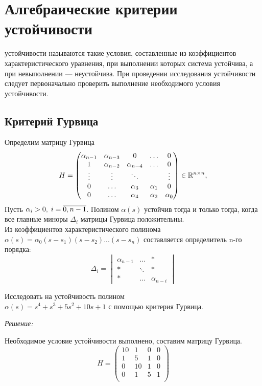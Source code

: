 \documentclass[../../TAU.tex]{subfiles}
\begin{document}
\section{Алгебраические критерии устойчивости}

     устойчивости называются такие  условия, составленные из коэффициентов характеристического уравнения, при выполнении которых система устойчива, а при невыполнении --- неустойчива. При проведении исследования устойчивости следует первоначально проверить выполнение необходимого условия устойчивости.

\subsection{Критерий Гурвица}

    Определим матрицу Гурвица
    $$
        H =\begin{pmatrix}
            \alpha_{n-1} & \alpha_{n-3} & 0 & \ldots & 0 \\
            1 & \alpha_{n-2} & \alpha_{n-4} & \ldots & 0 \\
            \vdots & \vdots & \ddots && \vdots \\
            0 & \ldots & \alpha_{3} & \alpha_1 & 0 \\
            0 & \ldots & \alpha_4 & \alpha_2 & \alpha_0
        \end{pmatrix}\in\mathbb{R}^{n\times n},
    $$
    \theor[Гурвица] Пусть 
    $\alpha_i>0,\; i=\overline{0,n-1}$.
    Полином $\alpha(s)$ устойчив тогда и только тогда, когда все главные миноры $\Delta_i$ матрицы Гурвица положительны. \\
    Из коэффициентов характеристического полинома 
    $\alpha(s)=\alpha_0(s-s_1) (s-s_2) ... (s-s_n)$
    составляется определитель n-го порядка:
    $$
        \Delta_i =
        \begin{vmatrix}
            \alpha_{n-1}& \ldots& *\\
            *& \ddots & *\\
            *& \ldots & \alpha_{n-i}
        \end{vmatrix}
    $$

    \examp Исследовать на устойчивость полином\\
    $\alpha(s) = s^4+s^3+5s^2+10s+1$ 
    с помощью критерия Гурвица.

    {\it Решение:}\par
    Необходимое условие устойчивости выполнено, составим матрицу Гурвица.
    $$
        H = 
        \begin{pmatrix}
            10 & 1 & 0 & 0\\
            1 & 5 & 1 & 0 \\
            0 & 10 & 1 & 0\\
            0 & 1 & 5 & 1 \\
        \end{pmatrix}
    $$
\end{document}

